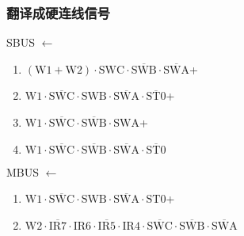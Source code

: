 \documentclass[UTF8]{ctexart}
\begin{document}
\subsubsection{翻译成硬连线信号}
SBUS $\leftarrow$
\begin{enumerate}[\indent\indent]
	\item $(\text{W1} + \text{W2}) \cdot \text{SWC} \cdot \overline{\text{SWB}} \cdot \overline{\text{SWA}}$+
	\item $\text{W1} \cdot \overline{\text{SWC}} \cdot \text{SWB} \cdot \overline{\text{SWA}} \cdot \overline {\text{ST0}}$+
	\item $\text{W1} \cdot \overline{\text{SWC}} \cdot\overline{\text{SWB}}\cdot  \text{SWA}$+
​	\item $\text{W1} \cdot \overline{\text{SWC}} \cdot\overline{\text{SWB}}\cdot \overline{\text{SWA}}\cdot \overline{\text{ST0}} $
\end{enumerate}

MBUS $\leftarrow$
\begin{enumerate}[\indent\indent]
	\item $\text{W1} \cdot \overline{\text{SWC}} \cdot \text{SWB} \cdot \overline{\text{SWA}} \cdot \text{ST0}$+
	\item $\text{W2} \cdot \overline{\text{IR7}} \cdot \text{IR6} \cdot \overline{\text{IR5}} \cdot \text{IR4} \cdot \overline{\text{SWC}} \cdot\overline{\text{SWB}}\cdot \overline{\text{SWA}}$
\end{enumerate}
\end{document}
